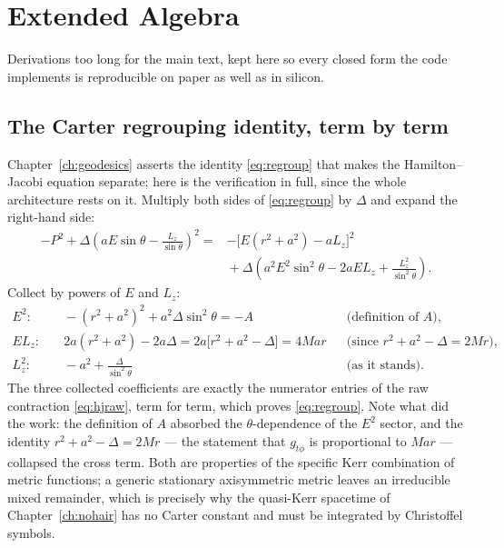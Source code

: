 \chapter{Extended Algebra}
\label{app:algebra}

Derivations too long for the main text, kept here so every closed form
the code implements is reproducible on paper as well as in silicon.

\section{The Carter regrouping identity, term by term}
\label{app:carterfull}

Chapter~\ref{ch:geodesics} asserts the identity \eqref{eq:regroup} that
makes the Hamilton--Jacobi equation separate; here is the verification
in full, since the whole architecture rests on it. Multiply both sides
of \eqref{eq:regroup} by $\Delta$ and expand the right-hand side:
\begin{align}
-P^2 + \Delta\left(aE\sin\theta - \frac{L_z}{\sin\theta}\right)^{\!2}
={}& -\bigl[E(r^2+a^2) - aL_z\bigr]^2 \nonumber\\
&{}+ \Delta\left(a^2E^2\sin^2\theta - 2aEL_z
+ \frac{L_z^2}{\sin^2\theta}\right) .
\end{align}
Collect by powers of $E$ and $L_z$:
\begin{align}
E^2:&\quad -(r^2+a^2)^2 + a^2\Delta\sin^2\theta = -A
&&\text{(definition of $A$)},\nonumber\\
EL_z:&\quad 2a(r^2+a^2) - 2a\Delta = 2a\bigl[r^2+a^2-\Delta\bigr]
= 4Mar
&&\text{(since $r^2+a^2-\Delta = 2Mr$)},\nonumber\\
L_z^2:&\quad -a^2 + \frac{\Delta}{\sin^2\theta}
&&\text{(as it stands)} .
\label{eq:regroupterms}
\end{align}
The three collected coefficients are exactly the numerator entries of
the raw contraction \eqref{eq:hjraw}, term for term, which proves
\eqref{eq:regroup}. Note what did the work: the definition of $A$
absorbed the $\theta$-dependence of the $E^2$ sector, and the identity
$r^2 + a^2 - \Delta = 2Mr$ — the statement that $g_{t\phi}$ is
proportional to $Mar$ — collapsed the cross term. Both are properties
of the specific Kerr combination of metric functions; a generic
stationary axisymmetric metric leaves an irreducible mixed remainder,
which is precisely why the quasi-Kerr spacetime of
Chapter~\ref{ch:nohair} has no Carter constant and must be integrated
by Christoffel symbols.

